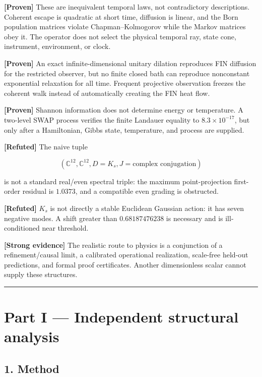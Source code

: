 \documentclass[11pt,a4paper,openany]{report}
\newcommand{\statusProven}{\textcolor{fingreen}{[Proven]}}
\newcommand{\statusStrong}{\textcolor{finblue}{[Strong evidence]}}
\newcommand{\statusRefuted}{\textcolor{finred}{[Refuted]}}
\begin{document}
\textbf{\statusProven{}} These are inequivalent temporal laws, not contradictory descriptions. Coherent escape is quadratic at short time, diffusion is linear, and the Born population matrices violate Chapman–Kolmogorov while the Markov matrices obey it. The operator does not select the physical temporal ray, state cone, instrument, environment, or clock.

\textbf{\statusProven{}} An exact infinite-dimensional unitary dilation reproduces FIN diffusion for the restricted observer, but no finite closed bath can reproduce nonconstant exponential relaxation for all time. Frequent projective observation freezes the coherent walk instead of automatically creating the FIN heat flow.

\textbf{\statusProven{}} Shannon information does not determine energy or temperature. A two-level SWAP process verifies the finite Landauer equality to \(8.3\times10^{-17}\), but only after a Hamiltonian, Gibbs state, temperature, and process are supplied.

\textbf{\statusRefuted{}} The naive tuple

\[
(\mathbb C^{12},\mathbb C^{12},D=K_s,J=\text{complex conjugation})
\]

is not a standard real/\allowbreak{}even spectral triple: the maximum point-projection first-order residual is \(1.0373\), and a compatible even grading is obstructed.

\textbf{\statusRefuted{}} \(K_s\) is not directly a stable Euclidean Gaussian action: it has seven negative modes. A shift greater than \(0.68187476238\) is necessary and is ill-conditioned near threshold.

\textbf{\statusStrong{}} The realistic route to physics is a conjunction of a refinement/\allowbreak{}causal limit, a calibrated operational realization, scale-free held-out predictions, and formal proof certificates. Another dimensionless scalar cannot supply these structures.

\par\medskip\hrule\medskip

\chapter{Part I — Independent structural analysis}

\section{1. Method}
\end{document}
